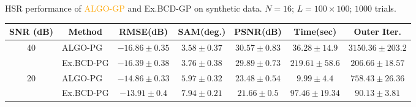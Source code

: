 \documentclass[10pt,mathserif]{beamer}
\begin{document}
\begin{frame}
\begin{table}[h]
\begin{adjustbox}{max width=\textwidth}
        \end{adjustbox}
        \caption{HSR performance of \textcolor{orange}{ALGO-GP} and Ex.BCD-GP on synthetic data.
                 $N = 16$; $L = 100 \times 100$; $1000$ trials.}
        \label{table:results_full_GP_MO16}
        \end{table}
        \begin{table}[h]
        \centering
        \begin{adjustbox}{max width=\textwidth}
        \begin{tabular}{|c|l|c|c|c|c|c|}
        \hline
        SNR (dB)            & \multicolumn{1}{c|}{Method}& RMSE(dB)                              & SAM(deg.)                             & PSNR(dB)                              & Time(sec)                               & Outer Iter.          \tabularnewline \hline
        \multirow{2}{*}{40} & ALGO-PG                    & \cellcolor{red!10}$-16.86   \pm 0.35$ & \cellcolor{red!10}$3.58     \pm 0.37$ & \cellcolor{red!10}$30.57    \pm 0.83$ & \cellcolor{red!10}$36.28    \pm 14.9$   & $3150.36  \pm 203.2$ \tabularnewline
                            & Ex.BCD-PG                  &                   $-16.39   \pm 0.38$ &                   $3.76     \pm 0.38$ &                   $29.89    \pm 0.73$ &                   $219.61   \pm 58.6$   & $206.66   \pm 18.57$ \tabularnewline \hline
        \multirow{2}{*}{20} & ALGO-PG                    & \cellcolor{red!10}$-14.86   \pm 0.33$ & \cellcolor{red!10}$5.97     \pm 0.32$ & \cellcolor{red!10}$23.48    \pm 0.54$ & \cellcolor{red!10}$9.99     \pm 4.4$    & $758.43   \pm 26.36$ \tabularnewline
                            & Ex.BCD-PG                  &                   $-13.91   \pm 0.4$  &                   $7.94     \pm 0.21$ &                   $21.66    \pm 0.5$  &                   $97.46    \pm 19.34$  & $90.13    \pm 3.81$  \tabularnewline \hline

\end{tabular}
\end{adjustbox}
\end{table}
\end{frame}
\end{document}
